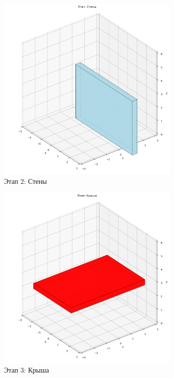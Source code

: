 \begin{figure}[H]
\centering
\includegraphics[width=0.8\textwidth]{images/task8/construction_стены.png}
\caption{Этап 2: Стены}
\end{figure}

\begin{figure}[H]
\centering
\includegraphics[width=0.8\textwidth]{images/task8/construction_крыша.png}
\caption{Этап 3: Крыша}
\end{figure}

